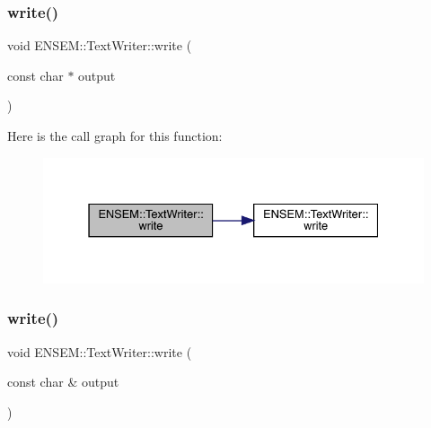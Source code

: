\mbox{\label{classENSEM_1_1TextWriter_ae8a8946f8f52884017f52cd69f809ba2}} 
\subsubsection{\texorpdfstring{write()}{write()}\hspace{0.1cm}{\footnotesize\ttfamily [4/24]}}
{\footnotesize\ttfamily void E\+N\+S\+E\+M\+::\+Text\+Writer\+::write (\begin{DoxyParamCaption}\item[{const char $\ast$}]{output }\end{DoxyParamCaption})}

Here is the call graph for this function\+:\nopagebreak
\begin{figure}[H]
\begin{center}
\leavevmode
\includegraphics[width=331pt]{db/d53/classENSEM_1_1TextWriter_ae8a8946f8f52884017f52cd69f809ba2_cgraph}
\end{center}
\end{figure}
\mbox{\label{classENSEM_1_1TextWriter_aef9f6c18d6d6995fadc116b65e58b35a}} 
\subsubsection{\texorpdfstring{write()}{write()}\hspace{0.1cm}{\footnotesize\ttfamily [5/24]}}
{\footnotesize\ttfamily void E\+N\+S\+E\+M\+::\+Text\+Writer\+::write (\begin{DoxyParamCaption}\item[{const char \&}]{output }\end{DoxyParamCaption})}

\mbox{\label{classENSEM_1_1TextWriter_aef9f6c18d6d6995fadc116b65e58b35a}} 
